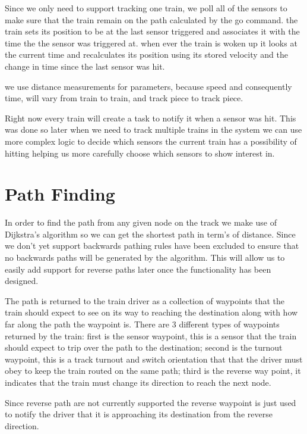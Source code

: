 \documentclass[pdftex,10pt,a4paper]{article}
\begin{document}
Since we only need to support tracking one train, we poll all of the sensors to
make sure that the train remain on the path calculated by the go command. the train
sets its position to be at the last sensor triggered and associates it with the time
the the sensor was triggered at. when ever the train is woken up it looks at the 
current time and recalculates its position using its stored velocity and the change
in time since the last sensor was hit.

we use distance measurements for parameters, because speed and
consequently time, will vary from train to train, and track piece to
track piece.

Right now every train will create a task to notify it when a sensor was hit.
This was done so later when we need to track multiple trains in the system we
can use more complex logic to decide which sensors the current train has a
possibility of hitting helping us more carefully choose which sensors to show
interest in.

\section*{Path Finding}

In order to find the path from any given node on the track we make use of
Dijkstra's algorithm so we can get the shortest path in term's of distance.
Since we don't yet support backwards pathing rules have been excluded to
ensure that no backwards paths will be generated by the algorithm. This will
allow us to easily add support for reverse paths later once the functionality
has been designed.

The path is returned to the train driver as a collection of waypoints that the
train should expect to see on its way to reaching the destination along with
how far along the path the waypoint is. There are 3 different types of
waypoints returned by the train: first is the sensor waypoint, this is a sensor
that the train should expect to trip over the path to the destination; second
is the turnout waypoint, this is a track turnout and switch orientation that
that the driver must obey to keep the train routed on the same path; third is
the reverse way point, it indicates that the train must change its direction to
reach the next node.

Since reverse path are not currently supported the reverse waypoint is just used
to notify the driver that it is approaching its destination from the reverse
direction.
\end{document}

